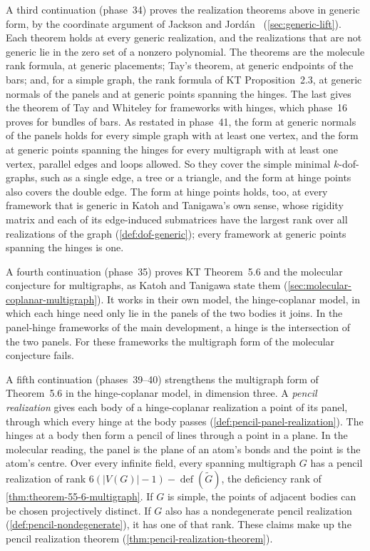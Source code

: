 A third continuation (phase~34) proves the realization theorems above in
generic form, by the coordinate argument of Jackson and
Jord\'an~\cite{jacksonJordan2009} (\cref{sec:generic-lift}). Each
theorem holds at every generic realization, and the realizations that
are not generic lie in the zero set of a nonzero polynomial. The
theorems are the molecule rank formula, at generic placements; Tay's
theorem, at generic endpoints of the bars; and, for a simple graph, the
rank formula of KT Proposition~2.3, at generic normals of the panels and
at generic points spanning the hinges. The last gives the theorem of Tay
and Whiteley for frameworks with hinges, which phase~16 proves for
bundles of bars. As restated in phase~41, the form at generic normals
of the panels holds for every simple graph with at least one vertex,
and the form at generic points spanning the hinges for every multigraph
with at least one vertex, parallel edges and loops allowed. So they
cover the simple minimal $k$-dof-graphs, such as a single edge,
a tree or a triangle, and the form at hinge points also covers the
double edge. The form at hinge points holds, too, at every framework
that is generic in Katoh and Tanigawa's own sense, whose rigidity matrix
and each of its edge-induced submatrices have the largest rank over all
realizations of the graph (\cref{def:dof-generic}); every framework at
generic points spanning the hinges is one.

A fourth continuation (phase~35) proves KT Theorem~5.6 and the molecular
conjecture for multigraphs, as Katoh and Tanigawa state them
(\cref{sec:molecular-coplanar-multigraph}). It works in their own model,
the hinge-coplanar model, in which each hinge need only lie in the
panels of the two bodies it joins. In the panel-hinge frameworks of the
main development, a hinge is the intersection of the two panels. For
these frameworks the multigraph form of the molecular conjecture fails.

A fifth continuation (phases~39--40) strengthens the multigraph form of
Theorem~5.6 in the hinge-coplanar model, in dimension three. A
\emph{pencil realization} gives each body of a hinge-coplanar realization
a point of its panel, through which every hinge at the body passes
(\cref{def:pencil-panel-realization}). The hinges at a body then form a
pencil of lines through a point in a plane. In the molecular reading, the
panel is the plane of an atom's bonds and the point is the atom's centre.
Over every infinite field, every spanning multigraph $G$ has a pencil
realization of rank $6(|V(G)| - 1) - \operatorname{def}(\tilde G)$, the
deficiency rank of \cref{thm:theorem-55-6-multigraph}. If $G$ is simple,
the points of adjacent bodies can be chosen projectively distinct. If $G$
also has a nondegenerate pencil realization
(\cref{def:pencil-nondegenerate}), it has one of that rank. These claims
make up the pencil realization theorem (\cref{thm:pencil-realization-theorem}).

